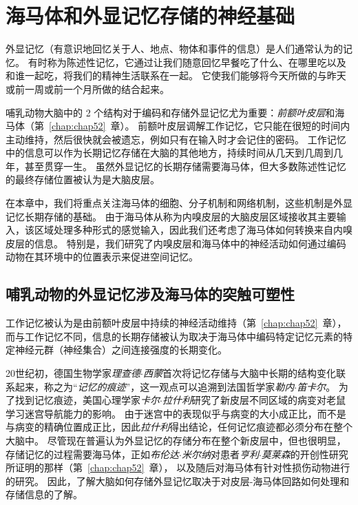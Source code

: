 \chapter{海马体和外显记忆存储的神经基础} \label{chap:chap54}

外显记忆（有意识地回忆关于人、地点、物体和事件的信息）是人们通常认为的记忆。
有时称为陈述性记忆，它通过让我们随意回忆早餐吃了什么、在哪里吃以及和谁一起吃，将我们的精神生活联系在一起。
它使我们能够将今天所做的与昨天或前一周或前一个月所做的结合起来。


哺乳动物大脑中的 2 个结构对于编码和存储外显记忆尤为重要：\textit{前额叶皮层}和海马体（第~\ref{chap:chap52}~章）。
前额叶皮层调解工作记忆，它只能在很短的时间内主动维持，然后很快就会被遗忘，例如只有在输入时才会记住的密码。
工作记忆中的信息可以作为长期记忆存储在大脑的其他地方，持续时间从几天到几周到几年，甚至贯穿一生。
虽然外显记忆的长期存储需要海马体，但大多数陈述性记忆的最终存储位置被认为是大脑皮层。


在本章中，我们将重点关注海马体的细胞、分子机制和网络机制，这些机制是外显记忆长期存储的基础。
由于海马体从称为内嗅皮层的大脑皮层区域接收其主要输入，该区域处理多种形式的感觉输入，因此我们还考虑了海马体如何转换来自内嗅皮层的信息。
特别是，我们研究了内嗅皮层和海马体中的神经活动如何通过编码动物在其环境中的位置表示来促进空间记忆。



\section{哺乳动物的外显记忆涉及海马体的突触可塑性}

工作记忆被认为是由前额叶皮层中持续的神经活动维持（第~\ref{chap:chap52}~章），而与工作记忆不同，信息的长期存储被认为取决于海马体中编码特定记忆元素的特定神经元群（神经集合）之间连接强度的长期变化。


20世纪初，德国生物学家\textit{理查德$\cdot$西蒙}首次将记忆存储与大脑中长期的结构变化联系起来，称之为“\textit{记忆的痕迹}”，这一观点可以追溯到法国哲学家\textit{勒内$\cdot$笛卡尔}。
为了找到记忆痕迹，美国心理学家\textit{卡尔$\cdot$拉什利}研究了新皮层不同区域的病变对老鼠学习迷宫导航能力的影响。
由于迷宫中的表现似乎与病变的大小成正比，而不是与病变的精确位置成正比，因此\textit{拉什利}得出结论，任何记忆痕迹都必须分布在整个大脑中。
尽管现在普遍认为外显记忆的存储分布在整个新皮层中，但也很明显，存储记忆的过程需要海马体，正如\textit{布伦达$\cdot$米尔纳}对患者\textit{亨利$\cdot$莫莱森}的开创性研究所证明的那样（第~\ref{chap:chap52}~章），
以及随后对海马体有针对性损伤动物进行的研究。
因此，了解大脑如何存储外显记忆取决于对皮层-海马体回路如何处理和存储信息的了解。


